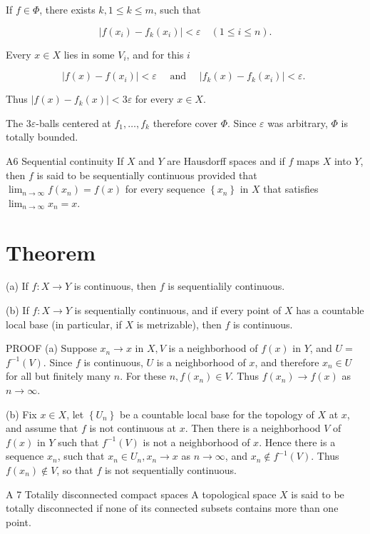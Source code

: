 \documentclass[10pt]{article}
\begin{document}
If $f \in \Phi$, there exists $k, 1 \leq k \leq m$, such that

$$
\left|f\left(x_{i}\right)-f_{k}\left(x_{i}\right)\right|<\varepsilon \quad(1 \leq i \leq n) .
$$

Every $x \in X$ lies in some $V_{i}$, and for this $i$

$$
\left|f(x)-f\left(x_{i}\right)\right|<\varepsilon \quad \text { and } \quad\left|f_{k}(x)-f_{k}\left(x_{i}\right)\right|<\varepsilon \text {. }
$$

Thus $\left|f(x)-f_{k}(x)\right|<3 \varepsilon$ for every $x \in X$.

The $3 \varepsilon$-balls centered at $f_{1}, \ldots, f_{k}$ therefore cover $\Phi$. Since $\varepsilon$ was arbitrary, $\Phi$ is totally bounded.

A6 Sequential continuity If $X$ and $Y$ are Hausdorff spaces and if $f$ maps $X$ into $Y$, then $f$ is said to be sequentially continuous provided that $\lim _{n \rightarrow \infty} f\left(x_{n}\right)=f(x)$ for every sequence $\left\{x_{n}\right\}$ in $X$ that satisfies $\lim _{n \rightarrow \infty} x_{n}=x$.

\section{Theorem}
(a) If $f: X \rightarrow Y$ is continuous, then $f$ is sequentialily continuous.

(b) If $f: X \rightarrow Y$ is sequentially continuous, and if every point of $X$ has a countable local base (in particular, if $X$ is metrizable), then $f$ is continuous.

PROOF (a) Suppose $x_{n} \rightarrow x$ in $X, V$ is a neighborhood of $f(x)$ in $Y$, and $U=$ $f^{-1}(V)$. Since $f$ is continuous, $U$ is a neighborhood of $x$, and therefore $x_{n} \in U$ for all but finitely many $n$. For these $n, f\left(x_{n}\right) \in V$. Thus $f\left(x_{n}\right) \rightarrow f(x)$ as $n \rightarrow \infty$.

(b) Fix $x \in X$, let $\left\{U_{n}\right\}$ be a countable local base for the topology of $X$ at $x$, and assume that $f$ is not continuous at $x$. Then there is a neighborhood $V$ of $f(x)$ in $Y$ such that $f^{-1}(V)$ is not a neighborhood of $x$. Hence there is a sequence $x_{n}$, such that $x_{n} \in U_{n}, x_{n} \rightarrow x$ as $n \rightarrow \infty$, and $x_{n} \notin f^{-1}(V)$. Thus $f\left(x_{n}\right) \notin V$, so that $f$ is not sequentially continuous.

A 7 Totalily disconnected compact spaces A topological space $X$ is said to be totally disconnected if none of its connected subsets contains more than one point.
\end{document}
